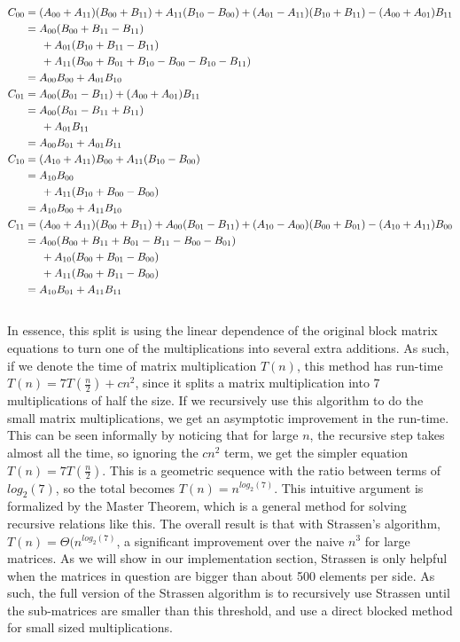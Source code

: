 \documentclass{article}         %
\begin{document}
\begin{equation}
\begin{split}
C_{00}&=(A_{00}+A_{11})(B_{00}+B_{11})+A_{11}(B_{10}-B_{00})+(A_{01}-A_{11})(B_{10}+B_{11})-(A_{00}+A_{01})B_{11}\\
&=A_{00}(B_{00}+B_{11}-B_{11})\\
&\indent+A_{01}(B_{10}+B_{11}-B_{11})\\
&\indent+A_{11}(B_{00}+B_{01}+B_{10}-B_{00}-B_{10}-B_{11})\\
&=A_{00}B_{00}+A_{01}B_{10}\\
C_{01}&=A_{00}(B_{01}-B_{11})+(A_{00}+A_{01})B_{11}\\
&=A_{00}(B_{01}-B_{11}+B_{11})\\
&\indent+A_{01}B_{11}\\
&=A_{00}B_{01}+A_{01}B_{11}\\
C_{10}&=(A_{10}+A_{11})B_{00}+A_{11}(B_{10}-B_{00})\\
&=A_{10}B_{00}\\
&\indent+A_{11}(B_{10}+B_{00}-B_{00})\\
&=A_{10}B_{00}+A_{11}B_{10}\\
C_{11}&=(A_{00}+A_{11})(B_{00}+B_{11})+A_{00}(B_{01}-B_{11})+(A_{10}-A_{00})(B_{00}+B_{01})-(A_{10}+A_{11})B_{00}\\
&=A_{00}(B_{00}+B_{11}+B_{01}-B_{11}-B_{00}-B_{01})\\
&\indent+A_{10}(B_{00}+B_{01}-B_{00})\\
&\indent+A_{11}(B_{00}+B_{11}-B_{00})\\
&=A_{10}B_{01}+A_{11}B_{11}\\
\end{split}
\end{equation}\\
In essence, this split is using the linear dependence of the original block matrix equations to turn one of the multiplications into several extra additions. As such, if we denote the time of matrix multiplication $T(n)$, this method has run-time $T(n)=7T(\frac n2)+cn^2$, since it splits a matrix multiplication into 7 multiplications of half the size. If we recursively use this algorithm to do the small matrix multiplications, we get an asymptotic improvement in the run-time. This can be seen informally by noticing that for large $n$, the recursive step takes almost all the time, so ignoring the $cn^2$ term, we get the simpler equation $T(n)=7T(\frac n2)$. This is a geometric sequence with the ratio between terms of $log_2(7)$, so the total becomes $T(n)=n^{log_2(7)}$. This intuitive argument is formalized by the Master Theorem, which is a general method for solving recursive relations like this. The overall result is that with Strassen's algorithm, $T(n)=\Theta(n^{log_2(7)}$, a significant improvement over the naive $n^3$ for large matrices. As we will show in our implementation section, Strassen is only helpful when the matrices in question are bigger than about 500 elements per side. As such, the full version of the Strassen algorithm is to recursively use Strassen until the sub-matrices are smaller than this threshold, and use a direct blocked method for small sized multiplications.
\end{document}
